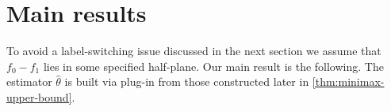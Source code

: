 \documentclass[journal]{IEEEtran}
\newtheorem{remark}{Remark}
\newcommand{\1}{\boldsymbol{1}}
\DeclarePairedDelimiter{\floor}{\lfloor}{\rfloor}
\begin{document}

\section{Main results}\label{sec:main-results}

To avoid a label-switching issue discussed in the next section we assume that $f_0-f_1$ lies in some specified half-plane. Our main result is the following. The estimator $\hat{\theta}$ is built via plug-in from those constructed later in \cref{thm:minimax-upper-bound}.
\end{document}
